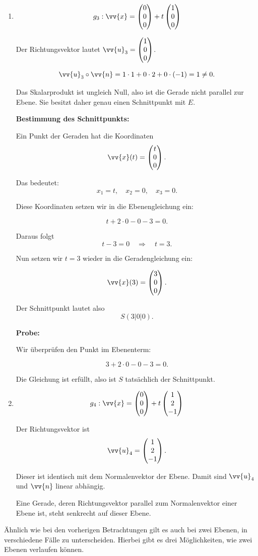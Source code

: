 \documentclass[ngerman, 12pt]{nssheetxea}
\begin{document}
\begin{example}
\begin{enumerate}
\bigskip

\item 
\[
g_3:\vv{x}=\colvec[0]{0}{0}+t\colvec[1]{0}{0}
\]

Der Richtungsvektor lautet $\vv{u}_3=\colvec[1]{0}{0}$.

\[
\vv{u}_3 \circ \vv{n}
=
1\cdot 1 + 0\cdot 2 + 0\cdot (-1)
= 1 \neq 0.
\]

Das Skalarprodukt ist ungleich Null, also ist die Gerade nicht parallel zur Ebene.  
Sie besitzt daher genau einen Schnittpunkt mit $E$.

\medskip

\textbf{Bestimmung des Schnittpunkts:}

Ein Punkt der Geraden hat die Koordinaten
\[
\vv{x}(t)=\colvec[t]{0}{0}.
\]

Das bedeutet:
\[
x_1=t, \quad x_2=0, \quad x_3=0.
\]

Diese Koordinaten setzen wir in die Ebenengleichung ein:

\[
t + 2\cdot 0 - 0 -3 = 0.
\]

Daraus folgt
\[
t -3 = 0 \quad \Rightarrow \quad t=3.
\]

Nun setzen wir $t=3$ wieder in die Geradengleichung ein:

\[
\vv{x}(3)=\colvec[3]{0}{0}.
\]

Der Schnittpunkt lautet also
\[
S(3|0|0).
\]

\medskip

\textbf{Probe:}

Wir überprüfen den Punkt im Ebenenterm:

\[
3 + 2\cdot 0 - 0 -3 = 0.
\]

Die Gleichung ist erfüllt, also ist $S$ tatsächlich der Schnittpunkt.

\bigskip

\item 
\[
g_4:\vv{x}=\colvec[0]{0}{0}+t\colvec[1]{2}{-1}
\]

Der Richtungsvektor ist
\[
\vv{u}_4=\colvec[1]{2}{-1}.
\]

Dieser ist identisch mit dem Normalenvektor der Ebene.  
Damit sind $\vv{u}_4$ und $\vv{n}$ linear abhängig.

Eine Gerade, deren Richtungsvektor parallel zum Normalenvektor einer Ebene ist, steht senkrecht auf dieser Ebene.

\end{enumerate}
\end{example}

Ähnlich wie bei den vorherigen Betrachtungen gilt es auch bei zwei Ebenen, in verschiedene Fälle zu unterscheiden. Hierbei gibt es drei Möglichkeiten, wie zwei Ebenen verlaufen können. 
\end{document}
